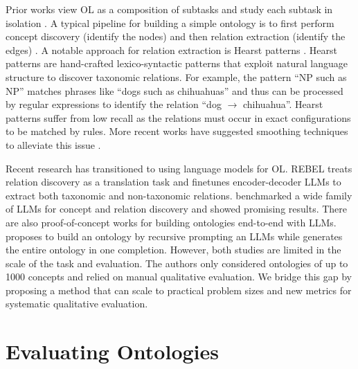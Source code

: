 Prior works view OL as a composition of subtasks and study each subtask in isolation \cite{buitelaar2005ontology,asim2018survey}. A typical pipeline for building a simple ontology is to first perform concept discovery (identify the nodes) and then relation extraction (identify the edges) \cite{cimiano2005text2onto,kaushik2018automatic}. A notable approach for relation extraction is Hearst patterns \cite{hearst1998automated}. Hearst patterns are hand-crafted lexico-syntactic patterns that exploit natural language structure to discover taxonomic relations. For example, the pattern ``NP such as NP'' matches phrases like ``dogs such as chihuahuas'' and thus can be processed by regular expressions to identify the relation ``dog $\to$ chihuahua''. Hearst patterns suffer from low recall as the relations must occur in exact configurations to be matched by rules. More recent works have suggested smoothing techniques to alleviate this issue \cite{roller2018hearst}.

Recent research has transitioned to using language models for OL. REBEL \cite{cabot2021rebel} treats relation discovery as a translation task and finetunes encoder-decoder LLMs to extract both taxonomic and non-taxonomic relations. \citet{babaei2023llms4ol} benchmarked a wide family of LLMs for concept and relation discovery and showed promising results. There are also proof-of-concept works for building ontologies end-to-end with LLMs. \citet{funk2023towards} proposes to build an ontology by recursive prompting an LLMs while \citet{trajanoska2023enhancing} generates the entire ontology in one completion. However, both studies are limited in the scale of the task and evaluation. The authors only considered ontologies of up to 1000 concepts and relied on manual qualitative evaluation. We bridge this gap by proposing a method that can scale to practical problem sizes and new metrics for systematic qualitative evaluation.

\section{Evaluating Ontologies}

